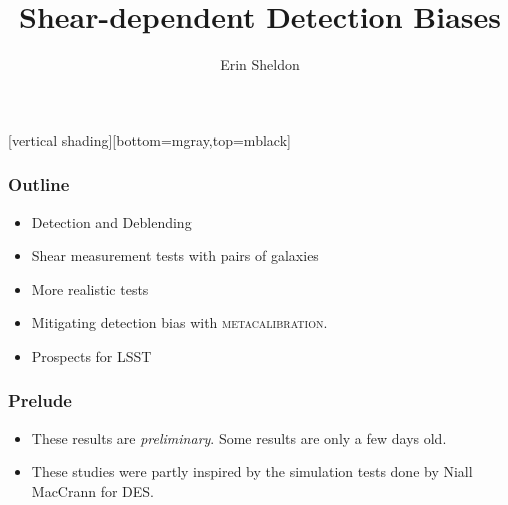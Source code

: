 \documentclass{beamer}
\title{Shear-dependent Detection Biases}
\author{Erin Sheldon}
\institute{Brookhaven National Laboratory}
\newcommand{\mcal}{\textsc{metacalibration}}
\begin{document}
\frame
{
}




\frame{\titlepage}

[vertical shading][bottom=mgray,top=mblack]





\frame
{
    \frametitle{Outline}

    \begin{itemize}

        \item Detection and Deblending
        \item Shear measurement tests with pairs of galaxies
        \item More realistic tests
        \item Mitigating detection bias with \mcal.
        \item Prospects for LSST

    \end{itemize}

}

\frame
{
    \frametitle{Prelude}

 
    \begin{itemize}

        \item These results are {\em preliminary}.  Some results are only
                a few days old.

        \item These studies were partly inspired by the simulation tests
            done by Niall MacCrann for DES.

    \end{itemize}

}
\end{document}
